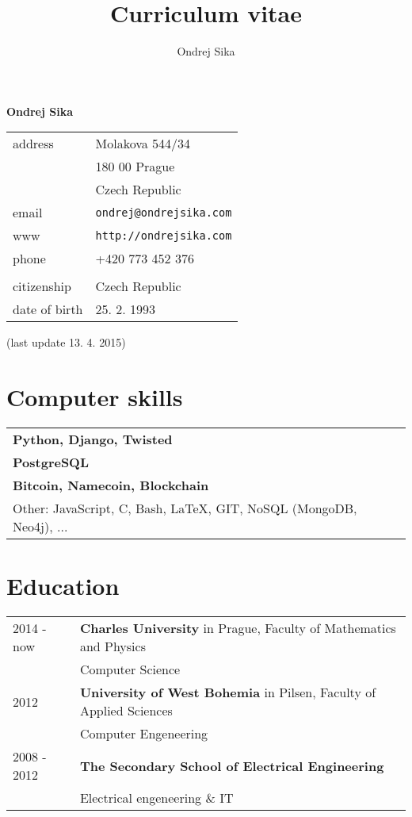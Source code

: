 \documentclass[12pt,a4paper]{article}
\title{Curriculum vitae}
\author{Ondrej Sika}
\begin{document}
\begin{center}
{\LARGE \bf Ondrej Sika}\\
\vspace*{0.2cm}
\begin{tabular}{R{5cm}L{5cm}}
address & Molakova 544/34\\
 & 180 00 Prague\\
 & Czech Republic\\
email & \texttt{ondrej@ondrejsika.com}\\
www & \texttt{http://ondrejsika.com}\\
phone & +420 773 452 376\\
\\
citizenship & Czech Republic\\
date of birth & 25. 2. 1993\\
\end{tabular}

\vspace*{0.2cm}
{\small (last update 13. 4. 2015)}
\end{center}

\section*{Computer skills}
\begin{tabular}{@{}ll}
{\bf Python, Django, Twisted} & \\
{\bf PostgreSQL} & \\
{\bf Bitcoin, Namecoin, Blockchain} & \\
Other: JavaScript, C, Bash, LaTeX, GIT, NoSQL (MongoDB, Neo4j), ... & \\
\end{tabular}

\section*{Education}
\begin{tabular}{@{}p{2cm}l}
2014 - now & {\bf Charles University} in Prague, Faculty of Mathematics and Physics\\
 & Computer Science\\
2012  & {\bf University of West Bohemia} in Pilsen, Faculty of Applied Sciences\\
 & Computer Engeneering\\
2008 - 2012 & {\bf The Secondary School of Electrical Engineering}\\
 & Electrical engeneering \& IT\\
\end{tabular}
\end{document}
